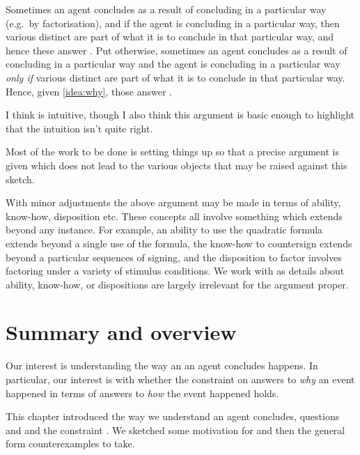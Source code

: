 \begin{note}
  Sometimes an agent concludes as a result of concluding in a particular way (e.g.\ by factorisation), and if the agent is concluding in a particular way, then various distinct  are part of what it is to conclude in that particular way, and hence these answer \qWhy{}.
  Put otherwise, sometimes an agent concludes as a result of concluding in a particular way and the agent is concluding in a particular way \emph{only if} various distinct  are part of what it is to conclude in that particular way.
  Hence, given \autoref{idea:why}, those \fingfr{} answer \qWhy{}.

  I think \issueInclusion{} is intuitive, though I also think this argument is basic enough to highlight that the intuition isn't quite right.

  Most of the work to be done is setting things up so that a precise argument is given which does not lead to the various objects that may be raised against this sketch.
\end{note}


\begin{note}
  With minor adjustments the above argument may be made in terms of ability, know-how, disposition etc.
  These concepts all involve something which extends beyond any instance.
  For example, an ability to use the quadratic formula extends beyond a single use of the formula, the know-how to countersign extends beyond a particular sequences of signing, and the disposition to factor involves factoring under a variety of stimulus conditions.
  We work with  as details about ability, know-how, or dispositions are largely irrelevant for the argument proper.
\end{note}

\section*{Summary and overview}
\label{sec:conclusion}

\begin{note}
  Our interest is understanding the way an  an agent concludes happens.
  In particular, our interest is with whether the constraint on answers to \emph{why} an event happened in terms of answers to \emph{how} the event happened holds.
\end{note}


\begin{note}
  This chapter introduced the way we understand  an agent concludes, questions \qWhy{} and \qHow{} and the constraint \issueInclusion{}.
  We sketched some motivation for \issueInclusion{} and then the general form counterexamples to \issueInclusion{} take.
\end{note}


